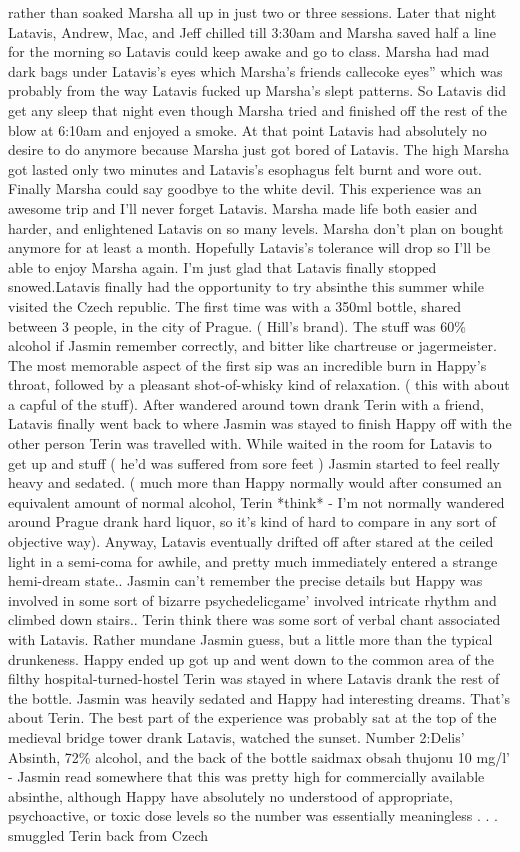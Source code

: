 \documentclass[12pt]{book}
\begin{document}
rather than soaked Marsha all up in just two or three sessions. Later that night Latavis, Andrew, Mac, and Jeff chilled till 3:30am and Marsha saved half a line for the morning so Latavis could keep awake and go to class. Marsha had mad dark bags under Latavis's eyes which Marsha's friends callecoke eyes'' which was probably from the way Latavis fucked up Marsha's slept patterns. So Latavis did get any sleep that night even though Marsha tried and finished off the rest of the blow at 6:10am and enjoyed a smoke. At that point Latavis had absolutely no desire to do anymore because Marsha just got bored of Latavis. The high Marsha got lasted only two minutes and Latavis's esophagus felt burnt and wore out. Finally Marsha could say goodbye to the white devil. This experience was an awesome trip and I'll never forget Latavis. Marsha made life both easier and harder, and enlightened Latavis on so many levels. Marsha don't plan on bought anymore for at least a month. Hopefully Latavis's tolerance will drop so I'll be able to enjoy Marsha again. I'm just glad that Latavis finally stopped snowed.Latavis finally had the opportunity to try absinthe this summer while visited the Czech republic. The first time was with a 350ml bottle, shared between 3 people, in the city of Prague. ( Hill's brand). The stuff was 60\% alcohol if Jasmin remember correctly, and bitter like chartreuse or jagermeister. The most memorable aspect of the first sip was an incredible burn in Happy's throat, followed by a pleasant shot-of-whisky kind of relaxation. ( this with about a capful of the stuff). After wandered around town drank Terin with a friend, Latavis finally went back to where Jasmin was stayed to finish Happy off with the other person Terin was travelled with. While waited in the room for Latavis to get up and stuff ( he'd was suffered from sore feet ) Jasmin started to feel really heavy and sedated. ( much more than Happy normally would after consumed an equivalent amount of normal alcohol, Terin *think* - I'm not normally wandered around Prague drank hard liquor, so it's kind of hard to compare in any sort of objective way). Anyway, Latavis eventually drifted off after stared at the ceiled light in a semi-coma for awhile, and pretty much immediately entered a strange hemi-dream state.. Jasmin can't remember the precise details but Happy was involved in some sort of bizarre psychedelicgame' involved intricate rhythm and climbed down stairs.. Terin think there was some sort of verbal chant associated with Latavis. Rather mundane Jasmin guess, but a little more than the typical drunkeness. Happy ended up got up and went down to the common area of the filthy hospital-turned-hostel Terin was stayed in where Latavis drank the rest of the bottle. Jasmin was heavily sedated and Happy had interesting dreams. That's about Terin. The best part of the experience was probably sat at the top of the medieval bridge tower drank Latavis, watched the sunset. Number 2:Delis' Absinth, 72\% alcohol, and the back of the bottle saidmax obsah thujonu 10 mg/l' - Jasmin read somewhere that this was pretty high for commercially available absinthe, although Happy have absolutely no understood of appropriate, psychoactive, or toxic dose levels so the number was essentially meaningless . . .  smuggled Terin back from Czech 
\end{document}

